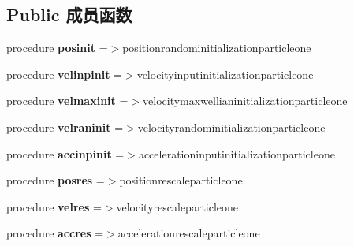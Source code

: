 \subsection*{Public 成员函数}
\begin{DoxyCompactItemize}
\item 
\mbox{\label{structmoduleparticleone_1_1particleone_a46004d4929ea1ef69094effbda587488}} 
procedure {\bfseries posinit} =$>$positionrandominitializationparticleone
\item 
\mbox{\label{structmoduleparticleone_1_1particleone_a1e56785c46f4758847ab6bc07a186873}} 
procedure {\bfseries velinpinit} =$>$velocityinputinitializationparticleone
\item 
\mbox{\label{structmoduleparticleone_1_1particleone_a4280272b67c98e59b9883a13ccbad6ad}} 
procedure {\bfseries velmaxinit} =$>$velocitymaxwellianinitializationparticleone
\item 
\mbox{\label{structmoduleparticleone_1_1particleone_ae6f58e0487089b128fc7474c9ecd4d22}} 
procedure {\bfseries velraninit} =$>$velocityrandominitializationparticleone
\item 
\mbox{\label{structmoduleparticleone_1_1particleone_a98d0a25353ebf0aa30d2520b115753d0}} 
procedure {\bfseries accinpinit} =$>$accelerationinputinitializationparticleone
\item 
\mbox{\label{structmoduleparticleone_1_1particleone_a6c009453e0371f1f41abbbdccb29206e}} 
procedure {\bfseries posres} =$>$positionrescaleparticleone
\item 
\mbox{\label{structmoduleparticleone_1_1particleone_afd87656491eac93fa8a9f983436c086c}} 
procedure {\bfseries velres} =$>$velocityrescaleparticleone
\item 
\mbox{\label{structmoduleparticleone_1_1particleone_af2de13d70e3f899deb96a06184509f76}} 
procedure {\bfseries accres} =$>$accelerationrescaleparticleone

\end{DoxyCompactItemize}
